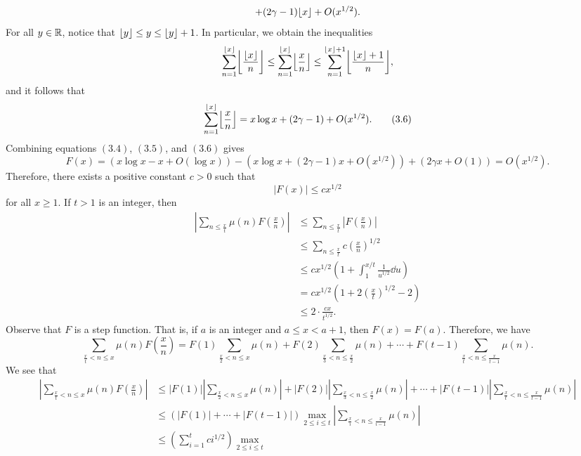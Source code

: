 \begin{pf}
\[    + (2\gamma - 1)\lfloor x\rfloor + O(x^{1/2}). \] 
    For all $y \in \mathbb{R}$, notice that $\lfloor y\rfloor \leq y \leq \lfloor y\rfloor+1$. In particular, 
    we obtain the inequalities 
    \[ \sum_{n=1}^{\floor{x}} \floor*{\frac{\floor{x}}n} \leq 
    \sum_{n=1}^{\floor{x}} \floor*{\frac{x}n} \leq 
    \sum_{n=1}^{\floor{x}+1} \floor*{\frac{\floor{x}+1}n}, \] 
    and it follows that 
    \[ \sum_{n=1}^{\floor{x}} \floor*{\frac{x}{n}} = x\log x + (2\gamma - 1) 
    + O(x^{1/2}). \tag{3.6} \] 
    Combining equations $(3.4)$, $(3.5)$, and $(3.6)$ gives 
    \[ F(x) = (x\log x - x + O(\log x)) - (x\log x + (2\gamma-1)x + O(x^{1/2})) 
    + (2\gamma x + O(1)) = O(x^{1/2}). \] 
    Therefore, there exists a positive constant $c > 0$ such that 
    \[ |F(x)| \leq cx^{1/2} \] 
    for all $x \geq 1$. If $t > 1$ is an integer, then 
    \begin{align*}
        \left| \sum_{n\leq \frac xt} \mu(n) F\left( \frac xn \right) \right| 
        &\leq \sum_{n\leq \frac xt} \left| F\left( \frac xn \right) \right| \\ 
        &\leq \sum_{n\leq \frac xt} c\left( \frac xn \right)^{\!1/2} \\
        &\leq cx^{1/2} \left( 1 + \int_1^{x/t} \frac{1}{u^{1/2}}\dd u \right) \\
        &= cx^{1/2} \left(1 + 2 \left( \frac xt \right)^{\!1/2} - 2 \right) \\ 
        &\leq 2 \cdot \frac{cx}{t^{1/2}}. \tag{3.7}
    \end{align*}
    Observe that $F$ is a step function. That is, if $a$ is an integer and 
    $a \leq x < a + 1$, then $F(x) = F(a)$. Therefore, we have 
    \[ \sum_{\frac xt < n \leq x} \mu(n) F\left(\frac xn \right) 
    = F(1) \sum_{\frac x2 < n \leq x} \mu(n) + F(2) \sum_{\frac x3 < n \leq 
    \frac x2} \mu(n) + \cdots + F(t-1) \sum_{\frac xt < n \leq \frac{x}{t-1}} \mu(n). \] 
    We see that 
    \begin{align*}
        \left| \sum_{\frac xt < n \leq x} \mu(n) F\left(\frac xn \right) \right| 
        &\leq |F(1)| \left| \sum_{\frac x2 < n \leq x} \mu(n) \right| + 
        |F(2)| \left| \sum_{\frac x3 < n \leq \frac x2} \mu(n) \right| + \cdots + 
        |F(t-1)| \left| \sum_{\frac xt < n \leq \frac{x}{t-1}} \mu(n) \right| \\ 
        &\leq (|F(1)| + \cdots + |F(t-1)|) \max_{2\leq i \leq t} 
        \left| \sum_{\frac xi < n \leq \frac{x}{i-1}} \mu(n) \right| \\ 
        &\leq \left( \sum_{i=1}^t ci^{1/2} \right) \max_{2\leq i \leq t} 

\end{align*}
\end{pf}
